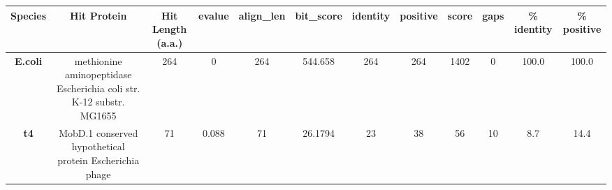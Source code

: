 \begin{tabular}{|c|c|c|c|c|c|c|c|c|c|c|c|} \hline
\textbf{Species} & \textbf{Hit Protein} & \textbf{Hit Length (a.a.)} & \textbf{evalue} & \textbf{align\_len} & \textbf{bit\_score} & \textbf{identity} & \textbf{positive} & \textbf{score} & \textbf{gaps} & \textbf{\% identity} & \textbf{\% positive} \\ \hline
\textbf{E.coli} & methionine aminopeptidase Escherichia coli str. K-12 substr. MG1655 & 264 & 0 & 264 & 544.658 & 264 & 264 & 1402 & 0 & 100.0 & 100.0\\
\textbf{t4} & MobD.1 conserved hypothetical protein Escherichia phage  & 71 & 0.088 & 71 & 26.1794 & 23 & 38 & 56 & 10 & 8.7 & 14.4\\
\hline \end{tabular}
